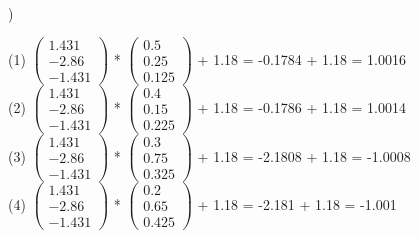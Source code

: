 \documentclass[12pt]{article}
\begin{document}
\noindent \hrulefill \\\pagebreak



) 

(1) 
$\begin{pmatrix}
1.431\\ -2.86\\ -1.431
\end{pmatrix}$ 
* 
$\begin{pmatrix}
0.5\\ 0.25\\ 0.125
\end{pmatrix}$
+ 1.18 = -0.1784 + 1.18 = 1.0016\\[.4em]

(2) 
$\begin{pmatrix}
1.431\\ -2.86\\ -1.431
\end{pmatrix}$ 
* 
$\begin{pmatrix}
0.4\\ 0.15\\ 0.225
\end{pmatrix}$
+ 1.18 = -0.1786 + 1.18 = 1.0014\\[.4em]

(3) 
$\begin{pmatrix}
1.431\\ -2.86\\ -1.431
\end{pmatrix}$ 
* 
$\begin{pmatrix}
0.3\\ 0.75\\ 0.325
\end{pmatrix}$
+ 1.18 = -2.1808 + 1.18 = -1.0008\\[.4em]

(4) 
$\begin{pmatrix}
1.431\\ -2.86\\ -1.431
\end{pmatrix}$ 
* 
$\begin{pmatrix}
0.2\\ 0.65\\ 0.425
\end{pmatrix}$
+ 1.18 = -2.181 + 1.18 = -1.001\\[-.4em]



\noindent \hrulefill \\
\end{document}
